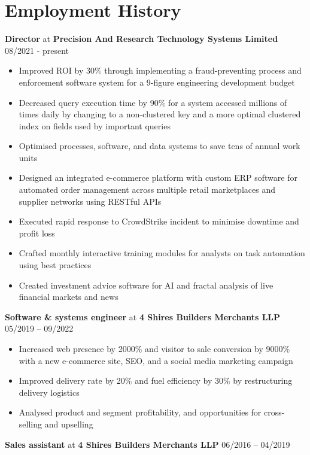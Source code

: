 \documentclass[10pt,a4paper]{article}
\begin{document}
\section*{Employment History}\vspace{-\baselineskip}\medskip
\textbf{Director} at \textbf{Precision And Research Technology Systems Limited} \hfill 08/2021 - present\vspace{-\baselineskip}\medskip
\begin{itemize}[noitemsep]
   \item Improved ROI by 30\% through implementing a fraud-preventing process and enforcement software system for a 9-figure engineering development budget
   \item Decreased query execution time by 90\% for a system accessed millions of times daily by changing to a non-clustered key and a more optimal clustered index on fields used by important queries
   \item Optimised processes, software, and data systems to save tens of annual work units
   \item Designed an integrated e-commerce platform with custom ERP software for automated order management across multiple retail marketplaces and supplier networks using RESTful APIs
   \item Executed rapid response to CrowdStrike incident to minimise downtime and profit loss
   \item Crafted monthly interactive training modules for analysts on task automation using best practices
   \item Created investment advice software for AI and fractal analysis of live financial markets and news
\end{itemize}
\textbf{Software \& systems engineer} at \textbf{4 Shires Builders Merchants LLP} \hfill 05/2019 -- 09/2022\vspace{-\baselineskip}\medskip
\begin{itemize}[noitemsep]
   \item Increased web presence by 2000\% and visitor to sale conversion by 9000\% with a new e-commerce site, SEO, and a social media marketing campaign
   \item Improved delivery rate by 20\% and fuel efficiency by 30\% by restructuring delivery logistics
   \item Analysed product and segment profitability, and opportunities for cross-selling and upselling
\end{itemize}
\textbf{Sales assistant} at \textbf{4 Shires Builders Merchants LLP} \hfill 06/2016 -- 04/2019\vspace{-\baselineskip}\medskip
\end{document}

